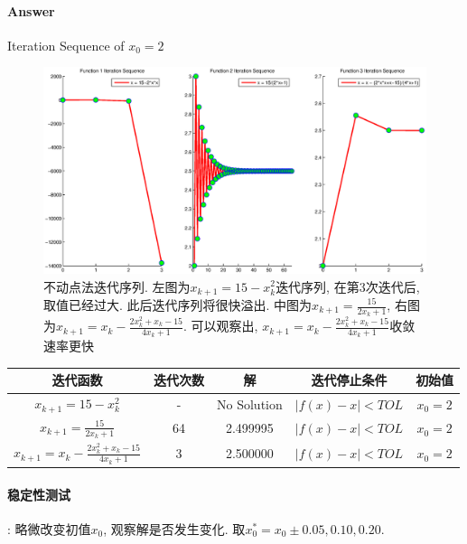 \documentclass{article}
\begin{document}
\begin{CJK*}{UTF8}{song}
			\paragraph{Answer}
				
				Iteration Sequence of $x_0=2$
					\begin{figure}[H]
						\centering
						\includegraphics[width=1.0\textwidth]{../chapter2_1_0.eps}
						\caption{不动点法迭代序列. 左图为$x_{k+1} = 15 - x_k^2$迭代序列, 在第$3$次迭代后, 取值已经过大. 此后迭代序列将很快溢出. 中图为$x_{k+1} = \frac{15}{2x_k+1}$, 右图为$x_{k+1} = x_k - \frac{2x_k^2+x_k-15}{4x_k+1}$. 可以观察出, $x_{k+1} = x_k - \frac{2x_k^2+x_k-15}{4x_k+1}$收敛速率更快}
						\label{img_chapter2_1_0}
					\end{figure}
				\begin{center}
					\begin{tabular}{|c|c|c|c|c|}
						\hline
						迭代函数 & 迭代次数 & 解 & 迭代停止条件 & 初始值 \\
						\hline
						$x_{k+1} = 15 - x_k^2$ & - & No Solution &$\left|f\left(x\right) - x\right| < TOL$ & $x_0=2$ \\
						\hline
						$x_{k+1} = \frac{15}{2x_k+1}$&  64 & 2.499995 & $\left|f\left(x\right) - x\right| < TOL$&$x_0 = 2$ \\
						\hline
						$x_{k+1} = x_k - \frac{2x_k^2+x_k-15}{4x_k+1}$ & 3 & 2.500000 & $\left|f\left(x\right) - x\right| < TOL$ & $x_0=2$ \\
						\hline
					\end{tabular}	
				\end{center}
			\paragraph{稳定性测试}:
				略微改变初值$x_0$, 观察解是否发生变化. 取$x_0^{*} = x_0 \pm 0.05,0.10,0.20$.
			

\end{CJK*}
\end{document}
